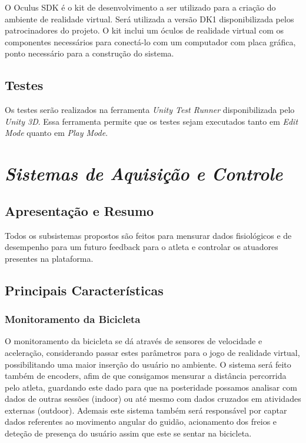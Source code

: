 O Oculus SDK é o kit de desenvolvimento a ser utilizado para a criação do ambiente de realidade virtual. Será utilizada a versão DK1 disponibilizada
pelos patrocinadores do projeto. O kit inclui um óculos de realidade virtual com os componentes necessários para conectá-lo com um computador com placa gráfica, ponto necessário para a construção do sistema.

\subsection{Testes}

Os testes serão realizados na ferramenta \textit{Unity Test Runner} disponibilizada pelo \textit{Unity 3D}. Essa ferramenta permite que os testes sejam executados tanto em \textit{Edit Mode} quanto em \textit{Play Mode}.

\section{\textit{Sistemas de Aquisição e Controle}}

\subsection{Apresentação e Resumo}
Todos os subsistemas propostos são feitos para mensurar dados fisiológicos e de desempenho para um futuro feedback para o atleta e controlar os atuadores presentes na plataforma.

\subsection{Principais Características}

\subsubsection{Monitoramento da Bicicleta}
O monitoramento da bicicleta se dá através de sensores de velocidade e aceleração, considerando passar estes parâmetros para o jogo de realidade virtual, possibilitando uma maior inserção do usuário no ambiente. O  sistema será feito também de encoders, afim de que consigamos mensurar a distância percorrida pelo atleta, guardando este dado para que na posteridade possamos analisar com dados de outras sessões (indoor) ou até mesmo com dados cruzados em atividades externas (outdoor). Ademais este sistema também será responsável por captar dados referentes ao movimento angular do guidão, acionamento dos freios e deteção de presença do usuário assim que este se sentar na bicicleta.

